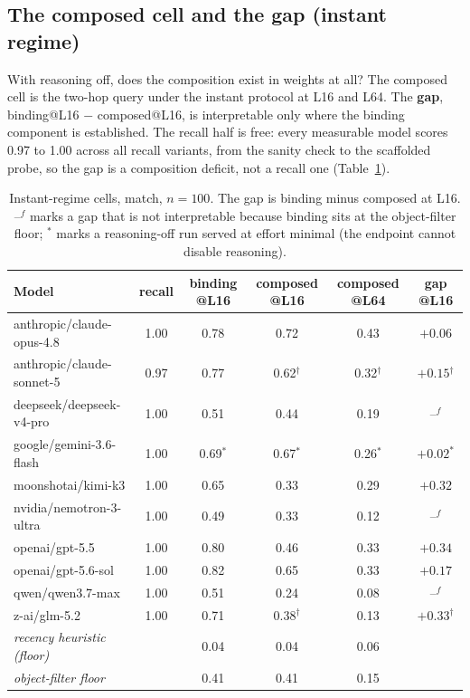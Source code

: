 \documentclass[11pt]{article}
\newcommand{\markdag}{$^{\dagger}$}
\newcommand{\floorgap}{--$^{f}$}
\begin{document}
\subsection{The composed cell and the gap (instant regime)}

With reasoning off, does the composition exist in weights at all? The composed cell is the two-hop query under the instant protocol at L16 and L64. The \textbf{gap},
binding@L16 $-$ composed@L16, is interpretable only where the binding component is
established. The recall half is free: every measurable model scores 0.97 to 1.00 across all recall variants, from the sanity check to the scaffolded probe, so the gap is a composition deficit, not a recall one
(Table~\ref{tab:gap}).

\begin{table}[h]
\centering
\small
\begin{tabular}{lccccc}
\toprule
Model & recall & binding @L16 & composed @L16 & composed @L64 & gap @L16 \\
\midrule
anthropic/claude-opus-4.8 & 1.00 & 0.78 & 0.72 & 0.43 & $+0.06$ \\
anthropic/claude-sonnet-5 & 0.97 & 0.77 & 0.62\markdag & 0.32\markdag & $+0.15$\markdag \\
deepseek/deepseek-v4-pro & 1.00 & 0.51 & 0.44 & 0.19 & \floorgap \\
google/gemini-3.6-flash & 1.00 & 0.69$^{*}$ & 0.67$^{*}$ & 0.26$^{*}$ & $+0.02^{*}$ \\
moonshotai/kimi-k3 & 1.00 & 0.65 & 0.33 & 0.29 & $+0.32$ \\
nvidia/nemotron-3-ultra & 1.00 & 0.49 & 0.33 & 0.12 & \floorgap \\
openai/gpt-5.5 & 1.00 & 0.80 & 0.46 & 0.33 & $+0.34$ \\
openai/gpt-5.6-sol & 1.00 & 0.82 & 0.65 & 0.33 & $+0.17$ \\
qwen/qwen3.7-max & 1.00 & 0.51 & 0.24 & 0.08 & \floorgap \\
z-ai/glm-5.2 & 1.00 & 0.71 & 0.38\markdag & 0.13 & $+0.33$\markdag \\
\midrule
\emph{recency heuristic (floor)} & & 0.04 & 0.04 & 0.06 & \\
\emph{object-filter floor} & & 0.41 & 0.41 & 0.15 & \\
\bottomrule
\end{tabular}
\caption{Instant-regime cells, match, $n=100$. The gap is binding minus composed at L16. \floorgap{} marks a gap that is not interpretable because binding sits at the object-filter floor; $^{*}$ marks a reasoning-off run served at effort minimal (the endpoint cannot disable reasoning).}
\label{tab:gap}
\end{table}
\end{document}
